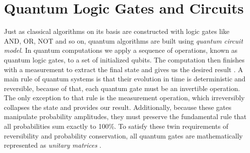 \section{Quantum Logic Gates and Circuits}
Just as classical algorithms on its basis are constructed with logic gates like AND, OR, NOT and so on, 
quantum algorithms are built using \textit{quantum circuit model}.
%
%
In quantum computations we apply a sequence of operations, known as quantum logic gates, to a set of initialized qubits.
%
%
The computation then finishes with a measurement to extract the final state and gives us the desired result \cite{deutsch1989quantum}.
%
%
A main rule of quantum systems is that their evolution in time is deterministic and reversible, 
because of that, each quantum gate must be an invertible operation.
%
%
The only exception to that rule is the measurement operation, which irreversibly collapses the state and provides our result.
%
%
Additionally, because these gates manipulate probability amplitudes, they must preserve the fundamental rule that all probabilities sum exactly to 100\%.
To satisfy these twin requirements of reversibility and probability conservation, all quantum gates are mathematically represented as \textit{unitary matrices} \cite{nielsen2010quantum}.
%
%
